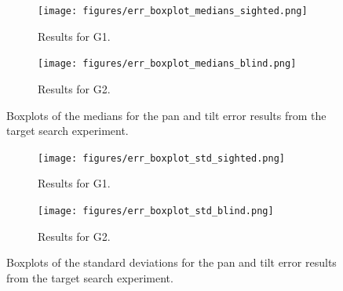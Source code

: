 \documentclass[sigconf, review=true, screen=true, anonymous=true]{acmart}
\begin{document}
\begin{figure}
  \centering
  \begin{subfigure}[t]{0.45\textwidth}
    \centering
    \texttt{[image: figures/err\_boxplot\_medians\_sighted.png]}
    \caption{Results for G1.}
  \end{subfigure}
  \begin{subfigure}[t]{0.45\textwidth}
    \centering
    \texttt{[image: figures/err\_boxplot\_medians\_blind.png]}
    \caption{Results for G2. }
  \end{subfigure}
  \caption{Boxplots of the medians for the pan and tilt error results from the target search experiment.}
  \label{fig:err-boxplots-medians}
\end{figure}

\begin{figure}
  \centering
  \begin{subfigure}[t]{0.45\textwidth}
    \centering
    \texttt{[image: figures/err\_boxplot\_std\_sighted.png]}
    \caption{Results for G1.}%
  \end{subfigure}
  \begin{subfigure}[t]{0.45\textwidth}
    \centering
    \texttt{[image: figures/err\_boxplot\_std\_blind.png]}
    \caption{Results for G2.}
  \end{subfigure}
  \caption{Boxplots of the standard deviations for the pan and tilt error results from the target search experiment.}
  \label{fig:err-boxplots-stds}
\end{figure}
\end{document}
